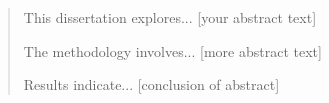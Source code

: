 \begin{abstract}
	This dissertation explores... [your abstract text]
	
	The methodology involves... [more abstract text]
	
	Results indicate... [conclusion of abstract]
\end{abstract}